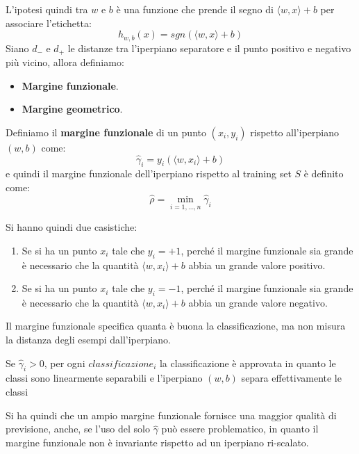 L'ipotesi quindi tra $w$ e $b$ è una funzione che prende il segno di $\langle w,
    x \rangle + b$ per associare l'etichetta:
\begin{equation}
    h_{w,b} (x) = sgn(\langle w, x \rangle + b)
\end{equation}
Siano $d_{-}$ e $d_{+}$ le distanze tra l'iperpiano separatore e il punto positivo
e negativo più vicino, allora definiamo:
\begin{itemize}
    \item \textbf{Margine funzionale}.
    \item \textbf{Margine geometrico}.
\end{itemize}
\begin{definizione}
    Definiamo il \textbf{margine funzionale} di un punto $(x_i, y_i)$ rispetto
    all'iperpiano $(w, b)$ come:
    \begin{equation}
        \hat{\gamma}_i = y_i( \langle w, x_i \rangle + b )
    \end{equation}
    e quindi il margine funzionale dell'iperpiano rispetto al training set $S$ è
    definito come:
    \begin{equation}
        \hat{\rho} = \min_{i = 1, \dots, n} \hat{\gamma}_i
    \end{equation}
\end{definizione}
Si hanno quindi due casistiche:
\begin{enumerate}
    \item Se si ha un punto $x_i$ tale che $y_i = +1$, perché il margine
          funzionale sia grande è necessario che la quantità $\langle w, x_i
              \rangle + b$ abbia un grande valore positivo.
    \item Se si ha un punto $x_i$ tale che $y_i = -1$, perché il margine funzionale
          sia grande è necessario che la quantità $\langle w, x_i \rangle + b$
          abbia un grande valore negativo.
\end{enumerate}
Il margine funzionale specifica quanta è buona la classificazione, ma non misura
la distanza degli esempi dall'iperpiano.
\begin{teorema}
    Se $\hat{\gamma}_i > 0$, per ogni $classificazione_i$ la classificazione è
    approvata in quanto le classi sono linearmente separabili e l'iperpiano
    $(w, b)$ separa effettivamente le classi
\end{teorema}
Si ha quindi che un ampio margine funzionale fornisce una maggior qualità
di previsione, anche, se l'uso del solo $\hat{\gamma}$ può essere problematico,
in quanto il margine funzionale non è invariante rispetto ad un iperpiano ri-scalato.

